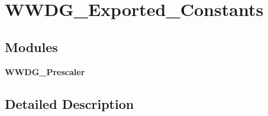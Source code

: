 \section{W\+W\+D\+G\+\_\+\+Exported\+\_\+\+Constants}
\label{group__WWDG__Exported__Constants}
\subsection*{Modules}
\begin{DoxyCompactItemize}
\item 
\textbf{ W\+W\+D\+G\+\_\+\+Prescaler}
\end{DoxyCompactItemize}


\subsection{Detailed Description}
